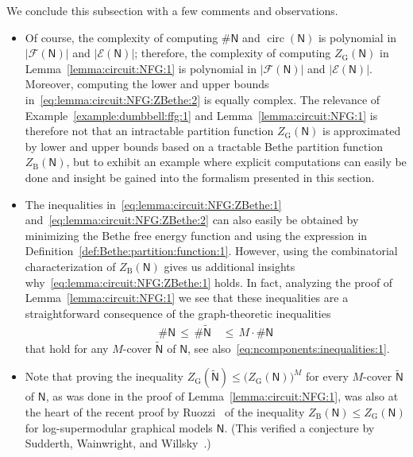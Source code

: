 \documentclass[journal, twocolumn]{IEEEtran}
\renewcommand{\leq}{\leqslant}
\newcommand{\set}[1]{\mathcal{#1}}
\newcommand{\graph}[1]{\mathsf{#1}}
\newcommand{\setE}{\set{E}}
\newcommand{\setF}{\set{F}}
\newcommand{\graphN}{\graph{N}}
\newcommand{\ZBethe}{Z_{\mathrm{B}}}
\newcommand{\cover}[1]{\tilde{#1}}
\newcommand{\cgraph}[1]{\cover{\graph{#1}}}
\newcommand{\?}{\mathrm{?}}
\newcommand{\ZGibbs}{Z_{\mathrm{G}}}
\newcommand{\cirrank}{\operatorname{circ}}
\newcommand{\ncomponents}{\#}
\begin{document}
We conclude this subsection with a few comments and observations.
\begin{itemize}

\item Of course, the complexity of computing $\ncomponents\graphN$ and
  $\cirrank(\graphN)$ is polynomial in $|\setF(\graphN)|$ and
  $|\setE(\graphN)|$; therefore, the complexity of computing
  $\ZGibbs(\graphN)$ in Lemma~\ref{lemma:circuit:NFG:1} is polynomial in
  $|\setF(\graphN)|$ and $|\setE(\graphN)|$. Moreover, computing the lower and
  upper bounds in~\eqref{eq:lemma:circuit:NFG:ZBethe:2} is equally complex.
  The relevance of Example~\ref{example:dumbbell:ffg:1} and
  Lemma~\ref{lemma:circuit:NFG:1} is therefore not that an intractable
  partition function $\ZGibbs(\graphN)$ is approximated by lower and upper
  bounds based on a tractable Bethe partition function $\ZBethe(\graphN)$, but
  to exhibit an example where explicit computations can easily be done and
  insight be gained into the formalism presented in this section.

\item The inequalities in~\eqref{eq:lemma:circuit:NFG:ZBethe:1}
  and~\eqref{eq:lemma:circuit:NFG:ZBethe:2} can also easily be obtained by
  minimizing the Bethe free energy function and using the expression in
  Definition~\ref{def:Bethe:partition:function:1}. However, using the
  combinatorial characterization of $\ZBethe(\graphN)$ gives us additional
  insights why~\eqref{eq:lemma:circuit:NFG:ZBethe:1} holds. In fact, analyzing
  the proof of Lemma~\ref{lemma:circuit:NFG:1} we see that these inequalities
  are a straightforward consequence of the graph-theoretic inequalities
  \begin{align*}
    \ncomponents\graphN
       \,\leq\,
         \ncomponents\cgraph{N}
      &\,\leq\,
         M
           \!\cdot\!
           \ncomponents\graphN
  \end{align*}
  that hold for any $M$-cover $\cgraph{N}$ of $\graphN$, see
  also~\eqref{eq:ncomponents:inequalities:1}.

\item Note that proving the inequality $\ZGibbs(\cgraph{N}) \leq \big(
  \ZGibbs(\graphN) \big)^M$ for every $M$-cover $\cgraph{N}$ of $\graphN$, as
  was done in the proof of Lemma~\ref{lemma:circuit:NFG:1}, was also at the
  heart of the recent proof by Ruozzi~\cite{Ruozzi:12:1} of the inequality
  $\ZBethe(\graphN) \leq \ZGibbs(\graphN)$ for log-supermodular graphical
  models $\graphN$. (This verified a conjecture by Sudderth, Wainwright, and
  Willsky~\cite{Sudderth:Wainwright:Willsky:07:1}.)


\end{itemize}
\end{document}
